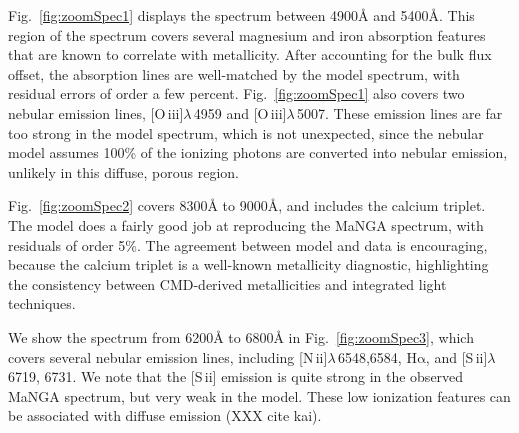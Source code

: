 \documentclass[preprint2]{aastex62}
\newcommand{\nii}{[N\,{\sc ii}]\xspace}
\newcommand{\sii}{[S\,{\sc ii}]\xspace}
\newcommand{\oiii}{[O\,{\sc iii}]\xspace}
\newcommand{\ha}{\ensuremath{\mathrm{H\alpha}}\xspace}
\newcommand{\ang}{\ensuremath{\mbox{\AA}}\xspace}
\begin{document}
Fig.~\ref{fig:zoomSpec1} displays the spectrum between 4900\ang and 5400\ang. This region of the spectrum covers several magnesium and iron absorption features that are known to correlate with metallicity. After accounting for the bulk flux offset, the absorption lines are well-matched by the model spectrum, with residual errors of order a few percent. Fig.~\ref{fig:zoomSpec1} also covers two nebular emission lines, \oiii$\lambda$\,4959 and \oiii$\lambda$\,5007. These emission lines are far too strong in the model spectrum, which is not unexpected, since the nebular model assumes 100\% of the ionizing photons are converted into nebular emission, unlikely in this diffuse, porous region.

Fig.~\ref{fig:zoomSpec2} covers 8300\ang to 9000\ang, and includes the calcium triplet. The model does a fairly good job at reproducing the MaNGA spectrum, with residuals of order 5\%. The agreement between model and data is encouraging, because the calcium triplet is a well-known metallicity diagnostic, highlighting the consistency between CMD-derived metallicities and integrated light techniques.

We show the spectrum from 6200\ang to 6800\ang in Fig.~\ref{fig:zoomSpec3}, which covers several nebular emission lines, including \nii$\lambda$\,6548,6584, \ha, and \sii$\lambda$\,6719, 6731. We note that the \sii emission is quite strong in the observed MaNGA spectrum, but very weak in the model. These low ionization features can be associated with diffuse emission (XXX cite kai).
\end{document}
